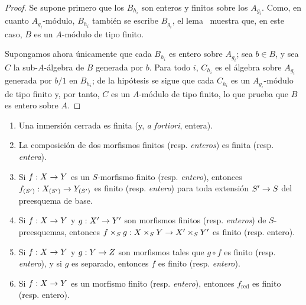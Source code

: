 \documentclass[oneside,10pt]{amsart}
\makeatletter
\newcommand{\ega@arrow}[2]{\mathchoice{#1}{#2}{#2}{#2}}
\renewcommand{\to}{\ega@arrow{\longrightarrow}{\rightarrow}}
\let\EGAOriginalLabel\label
\renewcommand{\label}[1]{\phantomsection\EGAOriginalLabel{#1}}
\makeatother
\begin{document}
\begin{proof}
Se supone primero que los $B_{h_i}$ son enteros y finitos sobre los $A_{g_i}$.
Como, en cuanto $A_{g_i}$-módulo, $B_{h_i}$ también se escribe $B_{g_i}$, el lema~ muestra que, en este caso, $B$ es un $A$-módulo de tipo finito.

Supongamos ahora únicamente que cada $B_{h_i}$ es entero sobre $A_{g_i}$;
sea $b\in B$, y sea $C$ la sub-$A$-álgebra de $B$ generada por $b$.
Para todo $i$, $C_{h_i}$ es el álgebra sobre $A_{g_i}$ generada por $b/1$ en $B_{h_i}$;
de la hipótesis se sigue que cada $C_{h_i}$ es un $A_{g_i}$-módulo de tipo finito y, por tanto,  $C$ es un $A$-módulo de tipo finito, lo que prueba que $B$ es entero sobre $A$.
\end{proof}

\begin{proposition}[6.1.5]
\label{II.6.1.5-fr}
\medskip\noindent
\begin{enumerate}
  \item[{\rm(i)}] Una inmersión cerrada es finita (y, \emph{a fortiori}, entera).
  \item[{\rm(ii)}] La composición de dos morfismos finitos \textup{(resp. \emph{enteros})} es finita \textup{(resp. \emph{entera})}.
  \item[{\rm(iii)}] Si $f:X\to Y$ es un $S$-morfismo finito \textup{(resp. \emph{entero})}, entonces $f_{(S')}:X_{(S')}\to Y_{(S')}$ es finito \textup{(resp. \emph{entero})} para toda extensión $S'\to S$ del preesquema de base.
  \item[{\rm(iv)}] Si $f:X\to Y$ y $g:X'\to Y'$ son morfismos finitos \textup{(resp. \emph{enteros})} de $S$-preesquemas, entonces $f\times_S g:X\times_S Y\to X'\times_S Y'$ es finito (resp. entero).
  \item[{\rm(v)}] Si $f:X\to Y$ y $g:Y\to Z$ son morfismos tales que $g\circ
f$ es finito \textup{(resp. \emph{entero})}, y si $g$ es separado, entonces $f$ es finito \textup{(resp. \emph{entero})}.
  \item[{\rm(vi)}] Si $f:X\to Y$ es un morfismo finito \textup{(resp. \emph{entero})}, entonces $f_{\mathrm{red}}$ es finito (resp. entero).
\end{enumerate}
\end{proposition}
\end{document}
